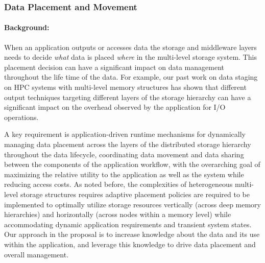 \subsubsection{Data Placement and Movement}
\label{sec:init-plac-data}

\paragraph{Background:}
When an application outputs or accesses data the storage and middleware layers needs to
decide \textit{what} data is placed \textit{where} in the multi-level storage system. 
This placement decision can have a significant impact on data management 
throughout the life time of the data. For example, our past work on data 
staging~\cite{tongipdps15,qiansc15,docan2012dataspaces,abbasi2010datastager} 
on HPC systems with multi-level memory structures has shown that different 
output techniques targeting different layers of the storage hierarchy can have a 
significant impact on the overhead observed by the application for I/O operations. 


A key requirement is application-driven runtime mechanisms for dynamically managing 
data placement across the layers of the distributed storage hierarchy throughout the 
data lifecycle, coordinating data movement and data sharing between the components 
of the application workflow, with the overarching goal of maximizing the relative utility 
to the application as well as the system while reducing access costs. 
%
As noted before, the complexities of heterogeneous multi-level storage structures requires 
adaptive placement policies are required to be implemented to optimally utilize storage 
resources vertically (across deep memory hierarchies) and horizontally (across nodes 
within a memory level) while accommodating dynamic application requirements and transient 
system states. 
%
Our approach in the proposal is to increase knowledge about the data and its use within the 
application, and leverage this knowledge to drive data placement and overall management. 


